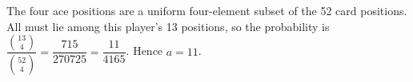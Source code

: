 The four ace positions are a uniform four-element subset of the 52 card positions. All must lie among this player's 13 positions, so the probability is $\dfrac{\binom{13}{4}}{\binom{52}{4}}=\dfrac{715}{270725}=\dfrac{11}{4165}$. Hence $\boxed{a=11}$.
